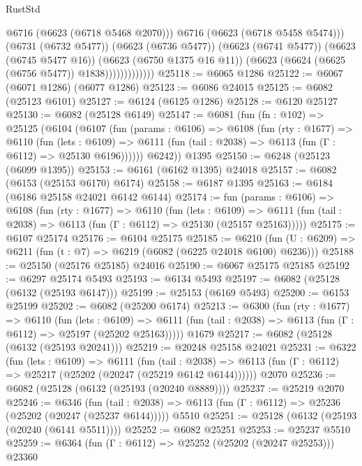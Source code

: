 \begin{lexlean}{RustStd}
\begin{coremodule}
                              @6716
                              (@6623 (@6718 @5468 @2070)))
                            @6716
                            (@6623 (@6718 @5458 @5474)))
                          (@6731 (@6732 @5477))
                          (@6623 (@6736 @5477))
                          (@6623 (@6741 @5477))
                          (@6623 (@6745 @5477 @16))
                          (@6623 (@6750 @1375 @16 @11))
                          (@6623 (@6624 (@6625 (@6756 @5477)) @1838)))))))))))))
@25118 := @6065 @1286
@25122 := @6067 (@6071 @1286) (@6077 @1286)
@25123 := @6086 @24015
@25125 := @6082 (@25123 @6101)
@25127 := @6124 (@6125 @1286)
@25128 := @6120 @25127
@25130 := @6082 (@25128 @6149)
@25147 := @6081
    (fun (fn : @102) =>
    @25125
      (@6104
        (@6107
          (fun (params : @6106) =>
          @6108
            (fun (rty : @1677) =>
            @6110
              (fun (lets : @6109) =>
              @6111 (fun (tail : @2038) => @6113 (fun (Γ : @6112) => @25130 @6196))))))
        @6242))
    @1395
@25150 := @6248 (@25123 (@6099 @1395))
@25153 := @6161 (@6162 @1395) @24018
@25157 := @6082 (@6153 (@25153 @6170) @6174)
@25158 := @6187 @1395
@25163 := @6184 (@6186 @25158 @24021 @6142 @6144)
@25174 := fun (params : @6106) =>
  @6108
    (fun (rty : @1677) =>
    @6110
      (fun (lets : @6109) =>
      @6111 (fun (tail : @2038) => @6113 (fun (Γ : @6112) => @25130 (@25157 @25163)))))
@25175 := @6107 @25174
@25176 := @6104 @25175
@25185 := @6210
    (fun (U : @6209) => @6211 (fun (t : @7) => @6219 (@6082 (@6225 @24018 @6100) @6236)))
@25188 := @25150 (@25176 @25185) @24016
@25190 := @6067 @25175 @25185
@25192 := @6297 @25174 @5493
@25193 := @6134 @5493
@25197 := @6082 (@25128 (@6132 (@25193 @6147)))
@25199 := @25153 (@6169 @5493)
@25200 := @6153 @25199
@25202 := @6082 (@25200 @6174)
@25213 := @6300
    (fun (rty : @1677) =>
    @6110
      (fun (lets : @6109) =>
      @6111 (fun (tail : @2038) => @6113 (fun (Γ : @6112) => @25197 (@25202 @25163)))))
    @1679
@25217 := @6082 (@25128 (@6132 (@25193 @20241)))
@25219 := @20248 @25158 @24021
@25231 := @6322
    (fun (lets : @6109) =>
    @6111
      (fun (tail : @2038) =>
      @6113 (fun (Γ : @6112) => @25217 (@25202 (@20247 (@25219 @6142 @6144))))))
    @2070
@25236 := @6082 (@25128 (@6132 (@25193 (@20240 @8889))))
@25237 := @25219 @2070
@25246 := @6346
    (fun (tail : @2038) => @6113 (fun (Γ : @6112) => @25236 (@25202 (@20247 (@25237 @6144)))))
    @5510
@25251 := @25128 (@6132 (@25193 (@20240 (@6141 @5511))))
@25252 := @6082 @25251
@25253 := @25237 @5510
@25259 := @6364 (fun (Γ : @6112) => @25252 (@25202 (@20247 @25253))) @23360

\end{coremodule}
\end{lexlean}
